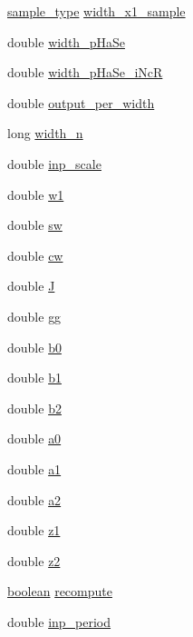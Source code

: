 \begin{DoxyCompactItemize}
\hyperlink{sound_8h_a3a9d1d4a1c153390d2401a6e9f71b32c}{sample\+\_\+type} \hyperlink{structeqbandvvv__susp__struct_a51cbea47172265c5d359ab3c07a4a5b6}{width\+\_\+x1\+\_\+sample}
\item 
double \hyperlink{structeqbandvvv__susp__struct_a208e02d695d7f6f83a9df47f2970b98c}{width\+\_\+p\+Ha\+Se}
\item 
double \hyperlink{structeqbandvvv__susp__struct_a493390b9a79657ab34ba363525a202fb}{width\+\_\+p\+Ha\+Se\+\_\+i\+NcR}
\item 
double \hyperlink{structeqbandvvv__susp__struct_aee0d41358a4548f7bcee511d2d63e542}{output\+\_\+per\+\_\+width}
\item 
long \hyperlink{structeqbandvvv__susp__struct_a807d2cab3f9ffecf1e47a9dfe2907981}{width\+\_\+n}
\item 
double \hyperlink{structeqbandvvv__susp__struct_a9a7b2bab723348a3be1c3524bd9fc9ff}{inp\+\_\+scale}
\item 
double \hyperlink{structeqbandvvv__susp__struct_a558bbe37641e8ec3ec1f30898be465f9}{w1}
\item 
double \hyperlink{structeqbandvvv__susp__struct_a8e76399e6b2b61253d65f93c0d7f7156}{sw}
\item 
double \hyperlink{structeqbandvvv__susp__struct_a2790e0d8728c31e953b8a400ea1832b0}{cw}
\item 
double \hyperlink{structeqbandvvv__susp__struct_af06a2798f39c7be17a952460ef4a6d46}{J}
\item 
double \hyperlink{structeqbandvvv__susp__struct_a9f3181b3620300ddbc514e8adf46795e}{gg}
\item 
double \hyperlink{structeqbandvvv__susp__struct_aefc586cb0f75d76774d7e1420ef9bd40}{b0}
\item 
double \hyperlink{structeqbandvvv__susp__struct_a56c95fa9f1da333f0d04967ad2550e7a}{b1}
\item 
double \hyperlink{structeqbandvvv__susp__struct_a8d7e8bd066b1cfbf3e81436873a2d4d8}{b2}
\item 
double \hyperlink{structeqbandvvv__susp__struct_a40e26796a2ebc6b4a4f03fbd1a38a8bb}{a0}
\item 
double \hyperlink{structeqbandvvv__susp__struct_a882992ea9403efc116cadee2d9194da0}{a1}
\item 
double \hyperlink{structeqbandvvv__susp__struct_a84ad71cfc457b95fba25247769956046}{a2}
\item 
double \hyperlink{structeqbandvvv__susp__struct_a0a7745485696a2af5bcd0cd35c28b2dd}{z1}
\item 
double \hyperlink{structeqbandvvv__susp__struct_aa40fcc62e1a542cbb3c7146dbd25351d}{z2}
\item 
\hyperlink{cext_8h_a7670a4e8a07d9ebb00411948b0bbf86d}{boolean} \hyperlink{structeqbandvvv__susp__struct_af2b45526043d9d589e5627099406a368}{recompute}
\item 
double \hyperlink{structeqbandvvv__susp__struct_a2eaacc14e589477a4c590034d7f2dbc6}{inp\+\_\+period}
\end{DoxyCompactItemize}


